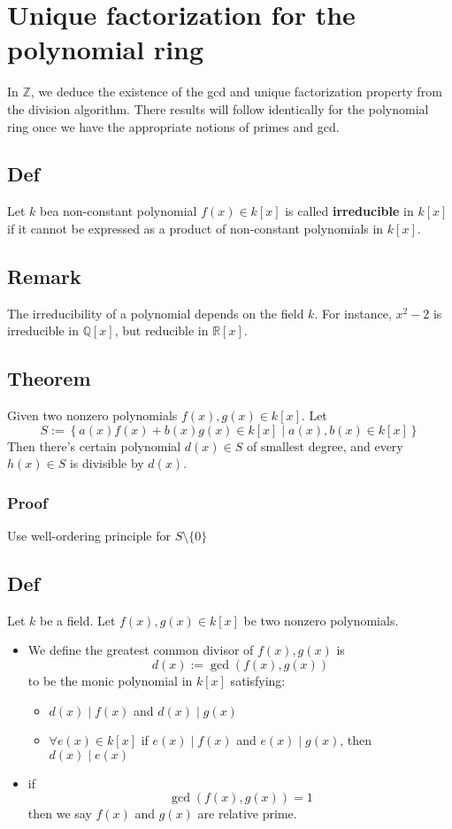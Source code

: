 \documentclass{book}
\begin{document}
\chapter{Unique factorization for the polynomial ring}
In $\mathbb Z$, we deduce the existence of the gcd and unique factorization property from the division algorithm. There results will follow identically for the polynomial ring once we have the appropriate notions of primes and gcd.
\section{Def}
Let $k$ bea non-constant polynomial $f(x)\in k[x]$ is called \textbf{irreducible} in $k[x]$ if it cannot be expressed as a product of non-constant polynomials in $k[x]$.

\section*{Remark}
The irreducibility of a polynomial depends on the field $k$. For instance, $x^2-2$ is irreducible in $\mathbb Q[x]$, but reducible in $\mathbb R[x]$.
\section{Theorem}
Given two nonzero polynomials $f(x),g(x)\in k[x]$. Let $$S:=\left\{a(x)f(x)+b(x)g(x)\in k[x]\mid a(x),b(x)\in k[x]\right\}$$
Then there's certain polynomial $d(x)\in S$ of smallest degree, and every $h(x)\in S$ is divisible by $d(x)$.\subsection*{Proof}Use well-ordering principle for $S\setminus\{0\}$
\section{Def}
Let $k$ be a field. Let $f(x),g(x)\in k[x]$ be two nonzero polynomials.
\begin{itemize}
	\item We define the greatest common divisor of $f(x),g(x)$ is $$d(x):=\gcd(f(x),g(x))$$ to be the monic polynomial in $k[x]$ satisfying:\begin{itemize}
		\item $d(x)\mid f(x)$ and $d(x)\mid g(x)$
		\item $\forall e(x)\in k[x]$ if $e(x)\mid f(x)$ and $e(x)\mid g(x)$, then $d(x)\mid e(x)$
	\end{itemize}
	\item if $$\gcd(f(x),g(x))=1$$then we say $f(x)$ and $g(x)$ are relative prime.
\end{itemize}
\end{document}
